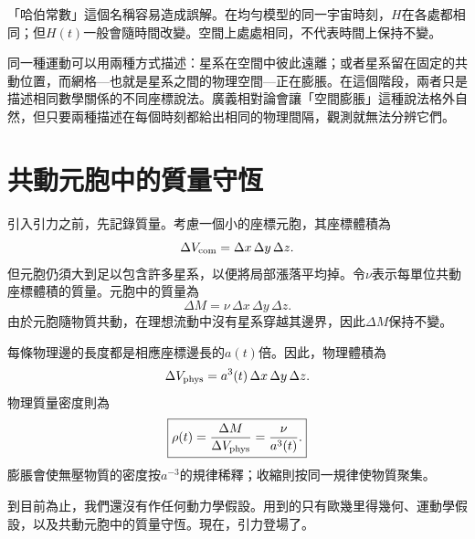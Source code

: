 「哈伯常數」這個名稱容易造成誤解。在均勻模型的同一宇宙時刻，\(H\)在各處都相同；但\(H(t)\)一般會隨時間改變。空間上處處相同，不代表時間上保持不變。

\begin{classroomqa}
\end{classroomqa}

同一種運動可以用兩種方式描述：星系在空間中彼此遠離；或者星系留在固定的共動位置，而網格---也就是星系之間的物理空間---正在膨脹。在這個階段，兩者只是描述相同數學關係的不同座標說法。廣義相對論會讓「空間膨脹」這種說法格外自然，但只要兩種描述在每個時刻都給出相同的物理間隔，觀測就無法分辨它們。

\section{共動元胞中的質量守恆}

引入引力之前，先記錄質量。考慮一個小的座標元胞，其座標體積為
\begin{equation}
\Delta V_{\rm com}=\Delta x\,\Delta y\,\Delta z.
\end{equation}
但元胞仍須大到足以包含許多星系，以便將局部漲落平均掉。令\(\nu\)表示每單位共動座標體積的質量。元胞中的質量為
\begin{equation}
\Delta M=\nu\,\Delta x\,\Delta y\,\Delta z.
\label{eq:c01-comoving-mass}
\end{equation}
由於元胞隨物質共動，在理想流動中沒有星系穿越其邊界，因此\(\Delta M\)保持不變。

每條物理邊的長度都是相應座標邊長的\(a(t)\)倍。因此，物理體積為
\begin{equation}
\Delta V_{\rm phys}=a^3(t)\,\Delta x\,\Delta y\,\Delta z.
\end{equation}
物理質量密度則為
\begin{equation}
\boxed{\rho(t)=\frac{\Delta M}{\Delta V_{\rm phys}}=\frac{\nu}{a^3(t)}.}
\label{eq:c01-density-dilution}
\end{equation}
膨脹會使無壓物質的密度按\(a^{-3}\)的規律稀釋；收縮則按同一規律使物質聚集。

到目前為止，我們還沒有作任何動力學假設。用到的只有歐幾里得幾何、運動學假設，以及共動元胞中的質量守恆。現在，引力登場了。

